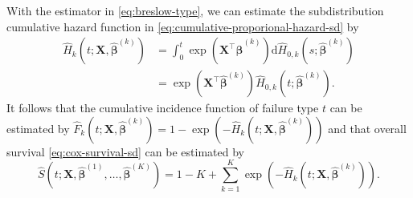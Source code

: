 \documentclass[11pt]{article}
\newcommand{\X}{\mathbf{X}}
\renewcommand{\b}{\bm{\beta}}
\renewcommand{\d}{\text{d}}
\begin{document}
With the estimator in \eqref{eq:breslow-type}, we can estimate the subdistribution cumulative hazard function in \eqref{eq:cumulative-proporional-hazard-sd} by
\begin{align*}
	\widehat{H}_k\left(t ; \X, \widehat{\b}^{(k)}\right)
	&=
	\int_0^t \exp\left( \X^\top \widehat{\b}^{(k)} \right) \d \widehat{H}_{0,k}\left(s ; \widehat{\b}^{(k)}\right)
	\\
	&= 
	\exp\left( \X^\top \widehat{\b}^{(k)} \right) \widehat{H}_{0,k}\left(t ; \widehat{\b}^{(k)}\right).
\end{align*}
It follows that the cumulative incidence function of failure type $t$ can be estimated by $\widehat{F}_k \left(t ; \X, \widehat{\b}^{(k)}\right) = 1 - \exp\left( -\widehat{H}_k\left(t ; \X, \widehat{\b}^{(k)}\right) \right)$ and that overall survival \eqref{eq:cox-survival-sd} can be estimated by
\[
	\widehat{S}\left( t ; \X, \widehat{\b}^{(1)}, \dots, \widehat{\b}^{(K)}\right)
	=
	1 - K + \sum_{k=1}^K \exp\left( -\widehat{H}_k\left( t ; \X, \widehat{\b}^{(k)} \right) \right).
\]




\end{document}
